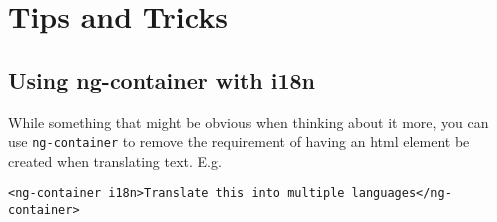 \section{Tips and Tricks}
\subsection{Using ng-container with i18n}
While something that might be obvious when thinking about it more, you can use 
\lstinline{ng-container} to remove the requirement of having an html element 
be created when translating text. E.g. 
\begin{lstlisting}
<ng-container i18n>Translate this into multiple languages</ng-container>
\end{lstlisting}
